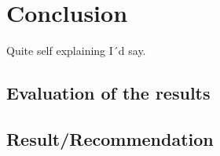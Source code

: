 \chapter{Conclusion} %
\label{Chapter7}


Quite self explaining I´d say.

\section{Evaluation of the results}

\section{Result/Recommendation}


